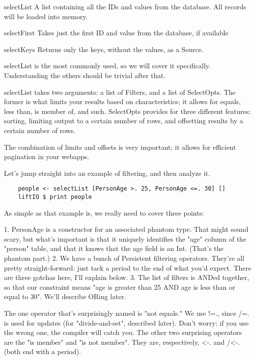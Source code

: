 selectList	A list containing all the IDs and values from the database. All records will be loaded into memory.

selectFirst	Takes just the first ID and value from the database, if available

selectKeys	Returns only the keys, without the values, as a Source.

selectList is the most commonly used, so we will cover it specifically. Understanding the others should be trivial after that.

selectList takes two arguments: a list of Filters, and a list of SelectOpts. The former is what limits your results based on characteristics; it allows for equals, less than, is member of, and such. SelectOpts provides for three different features: sorting, limiting output to a certain number of rows, and offsetting results by a certain number of rows.

The combination of limits and offsets is very important; it allows for efficient pagination in your webapps.

Let's jump straight into an example of filtering, and then analyze it.

\begin{lstlisting}
    people <- selectList [PersonAge >. 25, PersonAge <=. 30] []
    liftIO $ print people
\end{lstlisting}

As simple as that example is, we really need to cover three points:


1. PersonAge is a constructor for an associated phantom type. That might sound scary, but what's important is that it uniquely identifies the "age" column of the "person" table, and that it knows that the age field is an Int. (That's the phantom part.)
2. We have a bunch of Persistent filtering operators. They're all pretty straight-forward: just tack a period to the end of what you'd expect. There are three gotchas here, I'll explain below.
3. The list of filters is ANDed together, so that our constraint means "age is greater than 25 AND age is less than or equal to 30". We'll describe ORing later.

The one operator that's surprisingly named is "not equals." We use !=., since /=. is used for updates (for "divide-and-set", described later). Don't worry: if you use the wrong one, the compiler will catch you. The other two surprising operators are the "is member" and "is not member". They are, respectively, <-. and /<-. (both end with a period).

